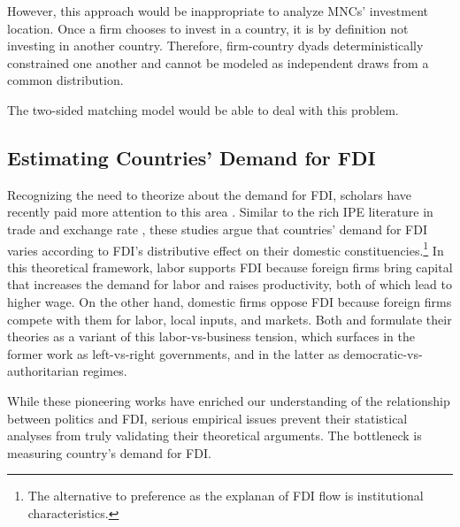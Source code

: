 However, this approach would be inappropriate to analyze MNCs' investment location. Once a firm chooses to invest in a country, it is by definition not investing in another country. Therefore, firm-country dyads deterministically constrained one another and cannot be modeled as independent draws from a common distribution.

The two-sided matching model would be able to deal with this problem.


\subsection{Estimating Countries' Demand for FDI}

Recognizing the need to theorize about the demand for FDI, scholars have recently paid more attention to this area \citep{Pinto2013, Pandya2016}. Similar to the rich IPE literature in trade and exchange rate \citep{Broz2001, Milner2005a}, these studies argue that countries' demand for FDI varies according to FDI's distributive effect on their domestic constituencies.\footnote{The alternative to preference as the explanan of FDI flow is institutional characteristics.} In this theoretical framework, labor supports FDI because foreign firms bring capital that increases the demand for labor and raises productivity, both of which lead to higher wage. On the other hand, domestic firms oppose FDI because foreign firms compete with them for labor, local inputs, and markets. Both \citet{Pinto2013} and \citet{Pandya2016} formulate their theories as a variant of this labor-vs-business tension, which surfaces in the former work as left-vs-right governments, and in the latter as democratic-vs-authoritarian regimes.

While these pioneering works have enriched our understanding of the relationship between politics and FDI, serious empirical issues prevent their statistical analyses from truly validating their theoretical arguments. The bottleneck is measuring country's demand for FDI.

